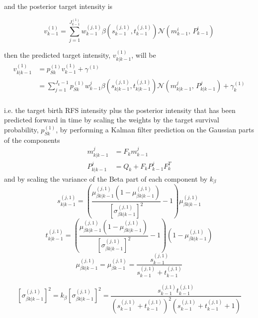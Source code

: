 \documentclass{article}
\newcommand{\tgt}{{(1)}}
\newcommand{\tgtj}{{(j,1)}}
\begin{document}
and the posterior target intensity is

\begin{equation}
  \label{eq:lpd_v1k-1}
  v_{k-1}^\tgt = \sum_{j=1}^{J^\tgt _{k-1}}w_{k-1}^{(j,1)} \beta(s_{k-1}^{(j, 1)}, t_{k-1}^{(j, 1)})\mathcal{N}(m_{k-1}^i,\,P_{k-1}^i)  
\end{equation}

then the predicted target intensity, $v^\tgt_{k|k-1}$, will be 
\begin{align}
  \label{eq:lpd_v1_predict}
  v_{k|k-1}^\tgt &= p_{Sk}^{(1)}v_{k-1}^\tgt + \gamma^{(1)}\\
           &= \sum_{j = 1}^{J_k-1}p_{Sk}^\tgt w_{k-1}^j \beta(s_{k|k-1}^{(j, 1)}, t_{k|k-1}^{(j, 1)}) \mathcal{N}(m_{k|k-1}^j,\,P_{k|k-1}^j) + \gamma^{(1)}_k\\
\end{align}

i.e. the target birth RFS intensity plus the posterior intensity that has been predicted forward in time by scaling the weights by the target survival probability, $p_{Sk}^\tgt$, by performing a Kalman filter prediction on the Gaussian parts of the components
\begin{align}
  \label{eq:lpd_kf_predict}
  m_{k|k-1}^j &= F_km_{k-1}^j\\
  P_{k|k-1}^j &= Q_k+F_kP_{k-1}^jF_k^T
\end{align}
and by scaling the variance of the Beta part of each component by $k_\beta$
\begin{equation}
  \label{eq:lpd_skk1}
  s_{k|k-1}^\tgtj = \left( \frac{ \mu_{\beta k|k-1 }^\tgtj \left( 1 -  \mu_{\beta k|k-1 }^\tgtj\right) }
    { \left[ \sigma_{\beta k|k-1}^\tgtj \right]^2  } -1 \right)  \mu_{\beta k|k-1 }^\tgtj
\end{equation}
\begin{equation}
  \label{eq:lpd_tkk1}
  t_{k|k-1}^\tgtj = \left( \frac{ \mu_{\beta k|k-1 }^\tgtj(1 -  \mu_{\beta k|k-1 }^\tgtj) }
    { \left[ \sigma_{\beta k|k-1}^\tgtj \right]^2  } -1 \right)  \left( 1 - \mu_{\beta k|k-1 }^\tgtj \right)
\end{equation}
\begin{equation}
  \label{eq:lpd_muk-1}
  \mu_{\beta k|k-1}^\tgtj = \mu_{\beta k-1}^\tgtj = \frac{s_{k-1}^\tgtj}{s_{k-1}^\tgtj + t_{k-1}^\tgtj}
\end{equation}

\begin{equation}
  \label{eq:lpd_sigk-1}
  \left[ \sigma_{\beta k|k-1}^\tgtj \right]^2 =
  k_\beta\left[ \sigma_{\beta k|k-1}^\tgtj \right]^2 =
  \frac{ s_{k-1}^\tgtj t_{k-1}^\tgtj }{ \left( s_{k-1}^\tgtj + t_{k-1}^\tgtj\right) ^2 \left( s_{k-1}^\tgtj + t_{k-1}^\tgtj + 1 \right) }
\end{equation}
\end{document}
